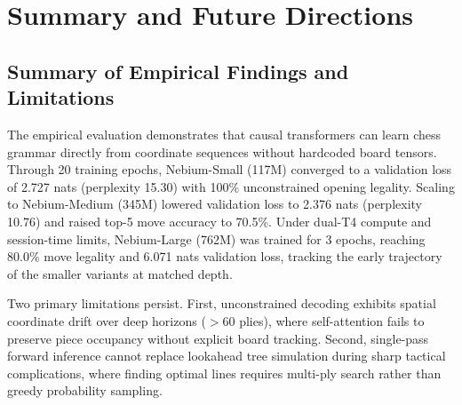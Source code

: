 \section{Summary and Future Directions}
\label{sec:summary}



\subsection{Summary of Empirical Findings and Limitations}
\label{sec:summary_findings}

The empirical evaluation demonstrates that causal transformers can learn chess grammar directly from coordinate sequences without hardcoded board tensors. Through 20 training epochs, Nebium-Small (117M) converged to a validation loss of 2.727 nats (perplexity 15.30) with 100\% unconstrained opening legality. Scaling to Nebium-Medium (345M) lowered validation loss to 2.376 nats (perplexity 10.76) and raised top-5 move accuracy to 70.5\%. Under dual-T4 compute and session-time limits, Nebium-Large (762M) was trained for 3 epochs, reaching 80.0\% move legality and 6.071 nats validation loss, tracking the early trajectory of the smaller variants at matched depth.

Two primary limitations persist. First, unconstrained decoding exhibits spatial coordinate drift over deep horizons ($>60$ plies), where self-attention fails to preserve piece occupancy without explicit board tracking. Second, single-pass forward inference cannot replace lookahead tree simulation during sharp tactical complications, where finding optimal lines requires multi-ply search rather than greedy probability sampling.


